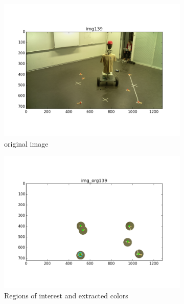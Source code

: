\begin{figure}[htb]
	\centering
	\begin{subfigure}[b]{0.49\linewidth}
        \centering
		\includegraphics[width=\linewidth]{files/_img139_cvt.png}
		\caption{original image}
		\label{fig:img}
	\end{subfigure}
	\begin{subfigure}[b]{0.49\linewidth}
        \centering
		\includegraphics[width=\linewidth]{files/_img_org139.png}
		\caption{Regions of interest and extracted colors}
		\label{fig:img_org}
	\end{subfigure}
	\begin{subfigure}[b]{0.49\linewidth}
        \centering

\end{subfigure}
\end{figure}
